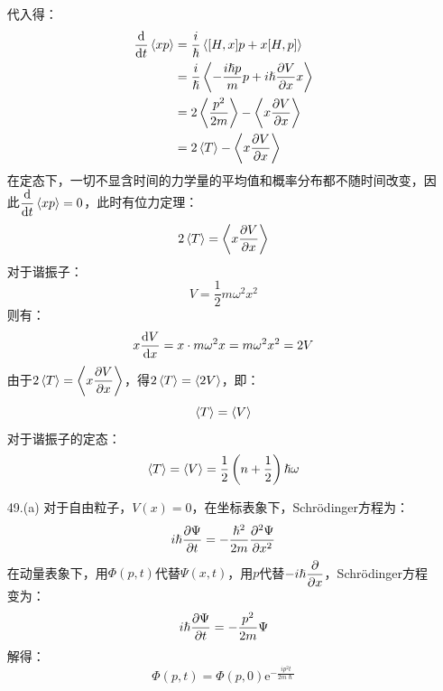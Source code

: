 \documentclass[a4paper,fontset=none]{ctexart}
\renewcommand\hbar\hslash
\begin{document}
\begin{itemize}
        代入得：
        \begin{align*}
            \dv{t}\expval{xp}
            &= \frac{i}{\hbar} \expval{\comm{H}{x}p + x\comm{H}{p}} \\
            &= \frac{i}{\hbar} \expval{-\frac{i\hbar p}{m} p + i\hbar \pdv{V}{x} x} \\
            &= 2\expval{\frac{p^2}{2m}} - \expval{x\pdv{V}{x}} \\
            &= 2\expval{T} - \expval{x\pdv{V}{x}}
        \end{align*}
        在定态下，一切不显含时间的力学量的平均值和概率分布都不随时间改变，因此$\displaystyle \dv{t}\expval{xp} = 0$，此时有位力定理：
        \[
            2\expval{T} = \expval{x\pdv{V}{x}}
        \]
        对于谐振子：
        \[
            V = \frac{1}{2}m\omega^2 x^2
        \]
        则有：
        \[
            x \dv{V}{x} = x \cdot m\omega^2 x = m\omega^2 x^2 = 2V
        \]
        由于$\displaystyle 2\expval{T} = \expval{x\pdv{V}{x}}$，得$2\expval{T} = \expval{2V}$，即：
        \[
            \expval{T} = \expval{V}
        \]
        对于谐振子的定态：
        \[
            \expval{T} = \expval{V} = \frac{1}{2} \left(n + \frac{1}{2}\right) \hbar\omega
        \]

        \bigskip
        \item[49.(a)]
        对于自由粒子，$V(x) = 0$，在坐标表象下，Schrödinger方程为：
        \[
            i\hbar \pdv{\Psi}{t} = -\frac{\hbar^2}{2m} \pdv[2]{\Psi}{x}
        \]
        在动量表象下，用$\Phi(p,t)$代替$\Psi(x,t)$，用$p$代替$\displaystyle -i\hbar\pdv{x}$，Schrödinger方程变为：
        \[
            i\hbar \pdv{\Psi}{t} = -\frac{p^2}{2m} \Psi
        \]
        解得：
        \[
            \Phi(p,t) = \Phi(p,0) \mathrm{e}^{-\tfrac{ip^2 t}{2m\hbar}}
        \]


\end{itemize}
\end{document}
